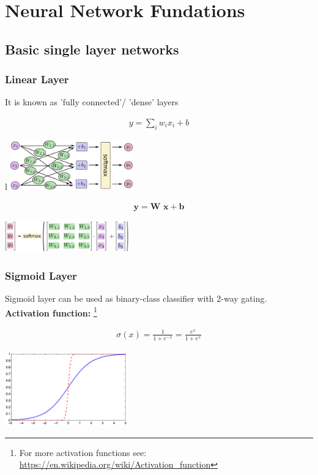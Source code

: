 \chapter{Neural Network Fundations}
\section{Basic single layer networks}

\subsection{Linear Layer}
It is known as 'fully connected'/ 'dense' layers

\begin{align}
	y=\sum_{i}w_ix_i+b
\end{align}

l	\includegraphics[width=0.4\textwidth]{figures/linear01}

\begin{align}
	\textbf{y}= \textbf{W x} + \textbf{b}
\end{align}	


	\includegraphics[width=0.4\textwidth]{figures/linear02}

\subsection{Sigmoid Layer}
Sigmoid layer can be used as binary-class classifier with 2-way gating.\\
\textbf{Activation function:} \footnote{For more activation functions see:\\ {\small\url{https://en.wikipedia.org/wiki/Activation_function}}}

\begin{align}
	\sigma(x)=\frac{1}{1+ e^{-x}} = \frac{e^x}{1+e^{x}}
\end{align}

\vspace{-10pt}
\begin{center}
	\includegraphics[width=0.4\textwidth]{figures/Sigmoid}
\end{center}


